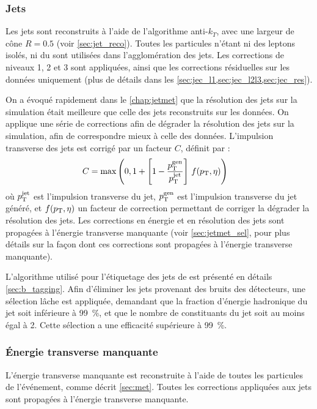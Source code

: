 \subsubsection{Jets}

Les jets sont reconstruits à l'aide de l'algorithme anti-$k_T$, avec une largeur de cône $R = \num{0.5}$ (voir \cref{sec:jet_reco}). Toutes les particules \pf n'étant ni des leptons isolés, ni du \pu sont utilisées dans l'agglomération des jets. Les corrections de niveaux 1, 2 et 3 sont appliquées, ainsi que les corrections résiduelles sur les données uniquement (plus de détails dans les \cref{sec:jec_l1,sec:jec_l2l3,sec:jec_res}).

On a évoqué rapidement dans le \cref{chap:jetmet} que la résolution des jets sur la simulation était meilleure que celle des jets reconstruits sur les données. On applique une série de corrections afin de dégrader la résolution des jets sur la simulation, afin de correspondre mieux à celle des données. L'impulsion transverse des jets est corrigé par un facteur $C$, définit par :
\begin{align*}
  C &= \max\left(0, 1 + \left[ 1 - \frac{p_{\mathrm{T}}^\text{gen}}{p_{\mathrm{T}}^\text{jet}} \right] \, f(p_{\mathrm{T}}, \eta)\right)
\end{align*}
où $p_{\mathrm{T}}^\text{jet}$ est l'impulsion transverse du jet, $p_{\mathrm{T}}^\text{gen}$ est l'impulsion transverse du jet généré, et $f(p_{\mathrm{T}}, \eta)$ un facteur de correction permettant de corriger la dégrader la résolution des jets. Les corrections en énergie et en résolution des jets sont propagées à l'énergie transverse manquante (voir \cref{sec:jetmet_sel},  pour plus détails sur la façon dont ces corrections sont propagées à l'énergie transverse manquante).

L'algorithme utilisé pour l'étiquetage des jets de \Pbottom est présenté en détails \cref{sec:b_tagging}. Afin d'éliminer les jets provenant des bruits des détecteurs, une sélection lâche est appliquée, demandant que la fraction d'énergie hadronique du jet soit inférieure à \SI{99}{\percent}, et que le nombre de constituants du jet soit au moins égal à 2. Cette sélection a une efficacité supérieure à \SI{99}{\%}.

\subsubsection{Énergie transverse manquante}

L'énergie transverse manquante est reconstruite à l'aide de toutes les particules \pf de l'événement, comme décrit \cref{sec:met}. Toutes les corrections appliquées aux jets sont propagées à l'énergie transverse manquante.

